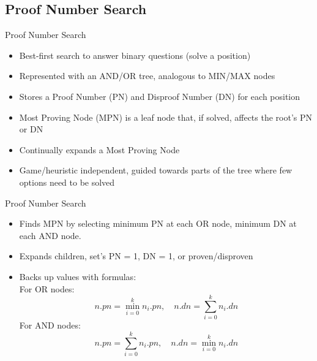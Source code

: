 \documentclass{beamer} %
\begin{document}
\subsection{Proof Number Search}

\begin{frame}{Proof Number Search}
\begin{itemize}
	\item Best-first search to answer binary questions (solve a position)
	\item Represented with an AND/OR tree, analogous to MIN/MAX nodes
	\item Stores a Proof Number (PN) and Disproof Number (DN) for each position
	\item Most Proving Node (MPN) is a leaf node that, if solved, affects the root's PN or DN
	\item Continually expands a Most Proving Node
	\item Game/heuristic independent, guided towards parts of the tree where few options need to be solved
\end{itemize}
\end{frame}


\begin{frame}{Proof Number Search}
\begin{itemize}
	\item Finds MPN by selecting minimum PN at each OR node, minimum DN at each AND node.
	\item Expands children, set's PN = 1, DN = 1, or proven/disproven
	\item Backs up values with formulas: \\
	For OR nodes: $$ n.pn = \displaystyle\min\limits_{i=0}^k n_i.pn,\quad n.dn = \displaystyle\sum\limits_{i=0}^k n_i.dn $$ For AND nodes: $$ n.pn = \displaystyle\sum\limits_{i=0}^k n_i.pn, \quad n.dn = \displaystyle\min\limits_{i=0}^k n_i.dn $$
\end{itemize}
\end{frame}
\end{document}
